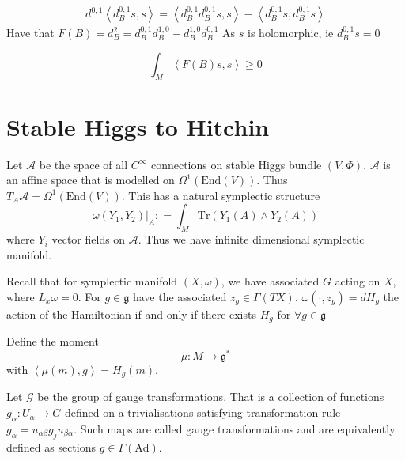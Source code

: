 \begin{align}
   d^{0,1}  \left< d_B ^{0,1} s, s \right> = \left<  d_B ^{0,1} d_B ^{0,1} s , s \right> - \left< d_B ^{0,1} s ,  d_B ^{0,1} s \right> 
\end{align}
Have that $ F(B) = d^2 _B =  d_B ^{0,1} d_B ^{1,0} - d_B ^{1,0} d_B ^{0,1} $
As $s$ is holomorphic, ie $ d_B ^{0,1} s = 0 $

\begin{equation}
    \int_M \left< F(B) s , s \right>  \geq 0 
\end{equation}




\section{Stable Higgs to Hitchin } %

Let $ \mathcal{A} $ be the space of all $C ^{\infty}$ connections on stable Higgs bundle $(V, \Phi)$. 
$\mathcal{A} $ is an affine space that is modelled on $ \Omega ^1(\mathrm{End}(V) )$. 
Thus $ T _ A \mathcal{A} = \Omega^1 ( \mathrm{End} ( V) ) $. 
This has a natural symplectic structure 
\begin{equation}
    \omega ( Y_1, Y_2 ) | _A : = \int _M \mathrm{Tr} (Y_1 ( A) \wedge Y_2 ( A) ) 
\end{equation}
where $Y_i$ vector fields on $ \mathcal{A} $. 
Thus we have infinite dimensional symplectic manifold. 

Recall that for symplectic manifold $(X, \omega)$, 
we have associated $G$ acting on $X$, where $ L_x \omega = 0 $. 
For $ g \in \mathfrak{g} $ have the associated $z_g \in \Gamma ( TX ) $.
$\omega( \cdot , z_g ) = d H_g $ the action of the Hamiltonian if and only if 
there exists $ H_g$ for $ \forall g \in \mathfrak{g} $ 

Define the moment 
\begin{equation}
    \mu : M \rightarrow \mathfrak{g} ^ * 
\end{equation}
with $ \left< \mu (m) , g \right> = H_g ( m) $.

Let $ \mathcal{G} $ be the group of gauge transformations. 
That is a collection of functions $g_{\alpha} : U_{\alpha} \rightarrow  {G} $ defined on a trivialisations
satisfying transformation rule $ g_{\alpha} = u_{\alpha \beta} g_j u_{\beta \alpha }$. 
Such maps are called gauge transformations and are equivalently defined as sections $g \in \Gamma(\mathrm{Ad}) $.
 

